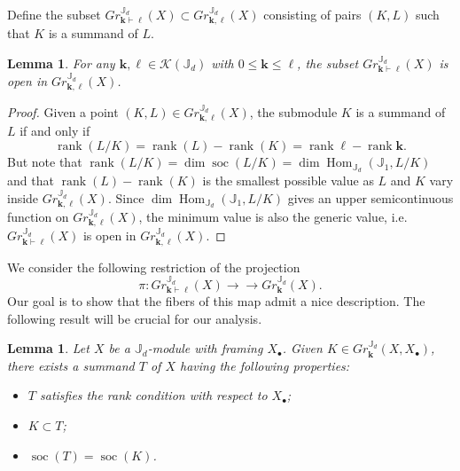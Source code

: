 \documentclass{amsart}
\numberwithin{equation}{section}
\newtheorem{lemma}[theorem]{Lemma}
\theoremstyle{definition}
\def\JJ{\mathbb{J}}
\def\bfk{\mathbf{k}}
\def\bfl{{\ensuremath{\boldsymbol\ell}}}
\def\cK{\mathcal{K}}
\def\dim{\operatorname{dim}}
\def\rank{\operatorname{rank}}
\def\Hom{\operatorname{Hom}}
\def\soc{\operatorname{soc}}
\newcommand{\partition}{\vdash}
\newcommand{\onto}{\to\!\!\!\!\!\to}
\begin{document}
Define the subset $Gr^{\JJ_d}_{\bfk\partition\bfl}(X)\subset Gr^{\JJ_d}_{\bfk,\bfl}(X)$ consisting of pairs $(K,L)$ such that $K$ is a summand of $L$.
\begin{lemma}
  For any $\bfk,\bfl\in\cK(\JJ_d)$ with $0\le\bfk\le\bfl$, the subset $Gr^{\JJ_d}_{\bfk\partition\bfl}(X)$ is open in $Gr^{\JJ_d}_{\bfk,\bfl}(X)$.
\end{lemma}
\begin{proof}
  Given a point $(K,L)\in Gr^{\JJ_d}_{\bfk,\bfl}(X)$, the submodule $K$ is a summand of $L$ if and only if 
  \[\rank(L/K)=\rank(L)-\rank(K)=\rank\bfl-\rank\bfk.\]
  But note that $\rank(L/K)=\dim\soc(L/K)=\dim\Hom_{\JJ_d}(\JJ_1,L/K)$ and that $\rank(L)-\rank(K)$ is the smallest possible value as $L$ and $K$ vary inside $Gr^{\JJ_d}_{\bfk,\bfl}(X)$.  Since $\dim\Hom_{\JJ_d}(\JJ_1,L/K)$ gives an upper semicontinuous function on $Gr^{\JJ_d}_{\bfk,\bfl}(X)$, the minimum value is also the generic value, i.e. $Gr^{\JJ_d}_{\bfk\partition\bfl}(X)$ is open in $Gr^{\JJ_d}_{\bfk,\bfl}(X)$.
\end{proof}
We consider the following restriction of the projection \[\pi:Gr^{\JJ_d}_{\bfk\partition\bfl}(X)\onto Gr^{\JJ_d}_\bfk(X).\]  Our goal is to show that the fibers of this map admit a nice description.  The following result will be crucial for our analysis.
\begin{lemma}\label{le:special summand}
  Let $X$ be a $\JJ_d$-module with framing $X_\bullet$.  Given $K\in Gr^{\JJ_d}_\bfk(X,X_\bullet)$, there exists a summand $T$ of $X$ having the following properties:
  \begin{itemize}
    \item $T$ satisfies the rank condition with respect to $X_\bullet$;
    \item $K\subset T$;
    \item $\soc(T)=\soc(K)$.
  \end{itemize}
\end{lemma}
\end{document}
